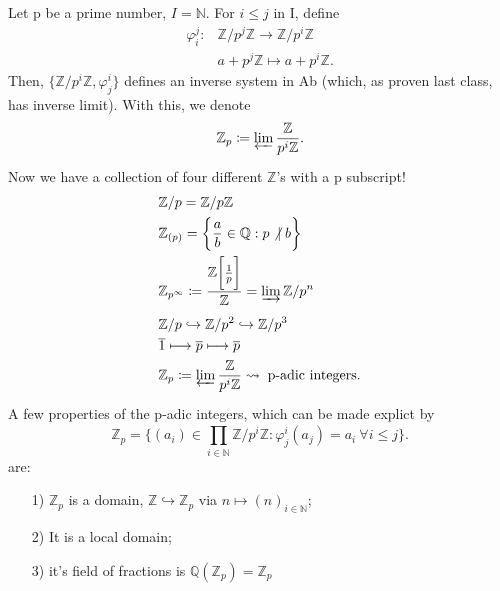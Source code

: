 \documentclass[../category_theory.tex]{subfiles}
\begin{document}
\begin{example}
	Let p be a prime number, \(I=\mathbb{N}\). For  \(i\leq j\) in I, define
	\begin{align*}
		\varphi_{i}^{j}: & \mathbb{Z}/p^{j}\mathbb{Z}\rightarrow \mathbb{Z}/p ^{i}\mathbb{Z} \\
		                 & a+p ^{j}\mathbb{Z}\mapsto a+p ^{i}\mathbb{Z}.
	\end{align*}
	Then, \(\{\mathbb{Z}/p ^{i}\mathbb{Z}, \varphi_{j}^{i}\}\) defines an inverse system in Ab (which, as proven last class, has inverse limit). With this, we denote
	\[
		\mathbb{Z}_{p}\coloneqq \varprojlim_{}\frac{\mathbb{Z}}{p ^{i}\mathbb{Z}}.
	\]
	Now we have a collection of four different \(\mathbb{Z}\)'s with a p subscript!
	\begin{align*}
		 & \mathbb{Z}/p = \mathbb{Z}/p\mathbb{Z}                                                                                   \\
		 & \mathbb{Z}_{(p)}=\biggl\{\frac{a}{b}\in \mathbb{Q}: p \not|\; b\biggr\}                                                 \\
		 & \mathbb{Z}_{p ^{\infty}}\coloneqq \frac{\mathbb{Z}\biggl[\frac{1}{p}\biggr]}{\mathbb{Z}}=\varinjlim_{}\mathbb{Z}/p ^{n} \\
		 & \mathbb{Z}/p \hookrightarrow \mathbb{Z}/p ^{2} \hookrightarrow \mathbb{Z}/p ^{3}                                        \\
		 & \overline{1}\longmapsto \overline{p}\longmapsto \overline{p}                                                            \\
		 & \mathbb{Z}_{p}\coloneqq \varprojlim_{}\frac{\mathbb{Z}}{p ^{i}\mathbb{Z}} \rightsquigarrow\;\text{p-adic integers}.
	\end{align*}
	A few properties of the p-adic integers, which can be made explict by
	\[
		\mathbb{Z}_{p}=\biggl\{(a_{i})\in \prod\limits_{i\in \mathbb{N}}^{}\mathbb{Z}/p ^{i}\mathbb{Z}: \varphi_{j}^{i}(a_{j})=a_{i}\: \forall i\leq j\biggr\}.
	\]
	are:
	\begin{itemize}
		\item[1)] \(\mathbb{Z}_{p}\) is a domain, \(\mathbb{Z}\hookrightarrow \mathbb{Z}_{p}\) via \(n\mapsto (n)_{i\in \mathbb{N}}\);
		\item[2)] It is a local domain;
		\item[3)] it's field of fractions is \(\mathbb{Q}(\mathbb{Z}_{p})=\mathbb{Z}_{p}\)
	\end{itemize}
	\begin{exr}

\end{exr}
\end{example}
\end{document}
